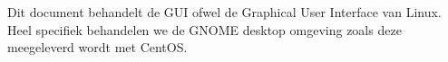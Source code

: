 Dit document behandelt de GUI ofwel de Graphical User Interface van Linux. Heel specifiek behandelen we de GNOME desktop omgeving zoals deze meegeleverd wordt met CentOS.
